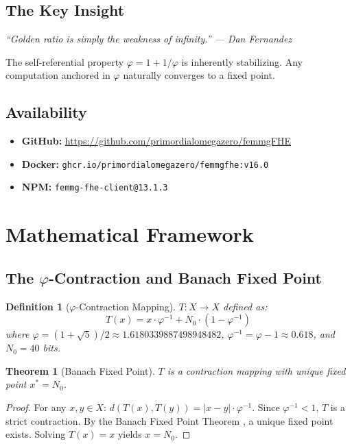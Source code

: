 \documentclass{article}
\newtheorem{theorem}{Theorem}[section]
\newtheorem{definition}{Definition}[section]
\begin{document}
\subsection{The Key Insight}

\textit{``Golden ratio is simply the weakness of infinity.'' — Dan Fernandez}

The self-referential property $\varphi = 1 + 1/\varphi$ is inherently stabilizing. Any computation anchored in $\varphi$ naturally converges to a fixed point.

\subsection{Availability}

\begin{itemize}
    \item \textbf{GitHub:} \url{https://github.com/primordialomegazero/femmgFHE}
    \item \textbf{Docker:} \texttt{ghcr.io/primordialomegazero/femmgfhe:v16.0}
    \item \textbf{NPM:} \texttt{femmg-fhe-client@13.1.3}
\end{itemize}

\section{Mathematical Framework}

\subsection{The $\varphi$-Contraction and Banach Fixed Point}

\begin{definition}[$\varphi$-Contraction Mapping]
$T: X \to X$ defined as:
\begin{equation}
T(x) = x \cdot \varphi^{-1} + N_0 \cdot (1 - \varphi^{-1})
\end{equation}
where $\varphi = (1+\sqrt{5})/2 \approx 1.6180339887498948482$, $\varphi^{-1} = \varphi - 1 \approx 0.618$, and $N_0 = 40$ bits.
\end{definition}

\begin{theorem}[Banach Fixed Point]
$T$ is a contraction mapping with unique fixed point $x^* = N_0$.
\end{theorem}

\begin{proof}
For any $x, y \in X$: $d(T(x), T(y)) = |x - y| \cdot \varphi^{-1}$. Since $\varphi^{-1} < 1$, $T$ is a strict contraction. By the Banach Fixed Point Theorem \cite{banach1922}, a unique fixed point exists. Solving $T(x) = x$ yields $x = N_0$.
\end{proof}
\end{document}
